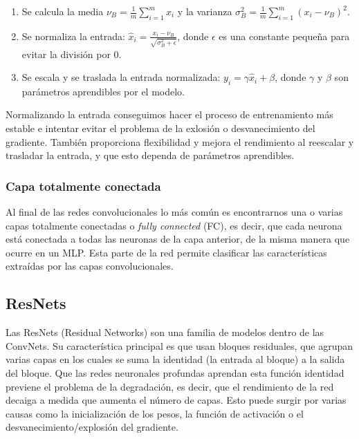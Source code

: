\begin{enumerate}

	\item Se calcula la media $\nu_{B}= \frac{1}{m} \sum_{i=1}^{m}x_i$ y la varianza $\sigma^{2}_B=\frac{1}{m} \sum_{i=1}^m(x_i - \nu_B)^2$.
	
	\item Se normaliza la entrada: $\hat{x}_i = \frac{x_i - \nu_B}{\sqrt{\sigma^{2}_B + \epsilon}}$, donde $\epsilon$ es una constante pequeña para evitar la división por 0.
	
	\item Se escala y se traslada la entrada normalizada: $y_i=\gamma \hat{x}_i + \beta$, donde $\gamma$ y $\beta$ son parámetros aprendibles por el modelo.
\end{enumerate}

Normalizando la entrada conseguimos hacer el proceso de entrenamiento más estable e intentar evitar el problema de la exlosión o desvanecimiento del gradiente. También proporciona flexibilidad y mejora el rendimiento al reescalar y trasladar la entrada, y que esto dependa de parámetros aprendibles.

\subsubsection{Capa totalmente conectada}

Al final de las redes convolucionales lo más común es encontrarnos una o varias capas totalmente conectadas o \textit{fully connected} (FC), es decir, que cada neurona está conectada a todas las neuronas de la capa anterior, de la misma manera que ocurre en un MLP. Esta parte de la red permite clasificar las características extraídas por las capas convolucionales.


\subsection{ResNets}
\label{sec:resnets}

Las ResNets (Residual Networks) \cite{ResNets} son una familia de modelos dentro de las ConvNets. Su característica principal es que usan bloques residuales, que agrupan varias capas en los cuales se suma la identidad (la entrada al bloque) a la salida del bloque. Que las redes neuronales profundas aprendan esta función identidad previene el problema de la degradación, es decir, que el rendimiento de la red decaiga a medida que aumenta el número de capas. Esto puede surgir por varias causas como la inicialización de los pesos, la función de activación o el desvanecimiento/explosión del gradiente. 

